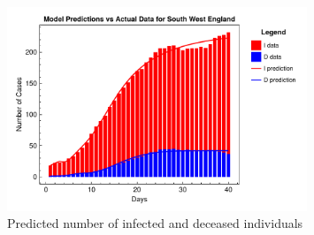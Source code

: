 \documentclass[12pt]{article}
\begin{document}
\begin{figure}[h]
    \centering
    \includegraphics[width=0.8\textwidth]{images/ude/South West England_infected_death_data.pdf}
    \caption{Predicted number of infected and deceased individuals}
    \label{fig:ude_South West England}
\end{figure}
\end{document}
